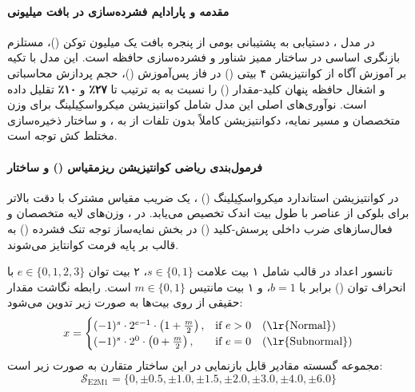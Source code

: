 \item {}

\paragraph*{مقدمه و پارادایم فشرده‌سازی در بافت میلیونی}
در مدل  \cite{deepseek2026v4}، دستیابی به پشتیبانی بومی از پنجره بافت یک میلیون توکن ()، مستلزم بازنگری اساسی در ساختار ممیز شناور و فشرده‌سازی حافظه است. این مدل با تکیه بر آموزش آگاه از کوانتیزیشن ۴ بیتی () در فاز پس‌آموزش ()، حجم پردازش محاسباتی و اشغال حافظه پنهان کلید-مقدار () را نسبت به  به ترتیب تا \textbf{۲۷٪} و \textbf{۱۰٪} تقلیل داده است. نوآوری‌های اصلی این مدل شامل کوانتیزیشن میکرواسکِیلینگ  برای وزن متخصصان و مسیر نمایه، دکوانتیزیشن کاملاً بدون تلفات از  به ، و ساختار ذخیره‌سازی مختلط کش توجه است.

\paragraph*{فرمول‌بندی ریاضی کوانتیزیشن ریزمقیاس () و ساختار }
در کوانتیزیشن استاندارد میکرواسکِیلینگ () \cite{rouhani2023microscaling}، یک ضریب مقیاس مشترک با دقت بالاتر برای بلوکی از عناصر با طول بیت اندک تخصیص می‌یابد. در ، وزن‌های لایه متخصصان  و فعال‌سازهای ضرب داخلی پرسش-کلید () در بخش نمایه‌ساز توجه تنک فشرده () به قالب  بر پایه فرمت  کوانتایز می‌شوند.

تانسور اعداد در قالب  شامل ۱ بیت علامت $s \in \{0, 1\}$، ۲ بیت توان $e \in \{0, 1, 2, 3\}$ با انحراف توان () برابر با $b = 1$، و ۱ بیت مانتیس $m \in \{0, 1\}$ است. رابطه نگاشت مقدار حقیقی از روی بیت‌ها به صورت زیر تدوین می‌شود:
\begin{equation}
    x = \begin{cases}
        (-1)^s \cdot 2^{e - 1} \cdot \left(1 + \frac{m}{2}\right), & \text{if } e > 0 \quad (\text{\lr{Normal}}) \\
        (-1)^s \cdot 2^{0} \cdot \left(0 + \frac{m}{2}\right), & \text{if } e = 0 \quad (\text{\lr{Subnormal}})
    \end{cases}
\end{equation}
مجموعه گسسته مقادیر قابل بازنمایی در این ساختار متقارن به صورت زیر است:
\begin{equation}
    \mathcal{S}_{\text{E2M1}} = \{0, \pm 0.5, \pm 1.0, \pm 1.5, \pm 2.0, \pm 3.0, \pm 4.0, \pm 6.0\}
\end{equation}

